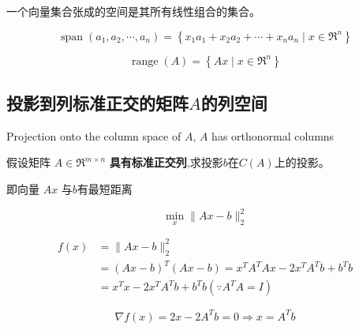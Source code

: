 \begin{definition}[向量集合张成的空间]
    一个向量集合张成的空间是其所有线性组合的集合。

    \begin{equation} \operatorname{span}\left(a_{1}, a_{2}, \cdots, a_{n}\right)=\left\{x_{1} a_{1}+x_{2} a_{2}+\cdots+x_{n} a_{n} \mid x \in \mathfrak{R}^{n}\right\} \end{equation}
\end{definition}

\begin{definition}
    \begin{equation} \operatorname{range}(A)=\left\{A x \mid x \in \mathfrak{R}^{n}\right\} \end{equation}
\end{definition}

\subsection{投影到列标准正交的矩阵$A$的列空间}
\label{chap:projection-onto-a}


\begin{FigureCenter}{Projection onto the column space of $A$, $A$ has orthonormal columns}
    

\end{FigureCenter}


\begin{problem}
    假设矩阵 $ A \in \mathfrak{R}^{m \times n} $ \textbf{具有标准正交列},求投影$b$在$C(A)$上的投影。
\end{problem}

即向量 $ A x $ 与$b$有最短距离

\begin{equation}
\min _{x}\|A x-b\|_{2}^{2}
\end{equation}

\begin{equation} \begin{aligned} f(x) &=\|A x-b\|_{2}^{2}
    \\ & =(A x-b)^{T}(A x-b)=x^{T} A^{T} A x-2 x^{T} A^{T} b+b^{T} b \\ &=x^{T} x-2 x^{T} A^{T} b+b^{T} b\left(\because A^{T} A=I\right) \end{aligned} \end{equation}

\begin{equation} \nabla f(x)=2 x-2 A^{T} b=0 \Rightarrow x=A^{T} b \end{equation}

